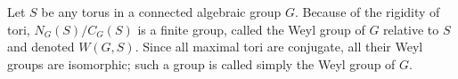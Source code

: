 Let $S$ be any torus in a connected algebraic group $G$. Because of the rigidity of tori, $N_G(S)/C_G(S)$ is a finite group, called the Weyl group of $G$ relative to $S$ and denoted $W(G, S)$. Since all maximal tori are conjugate, all their Weyl groups are isomorphic; such a group is called simply the Weyl group of $G$.
